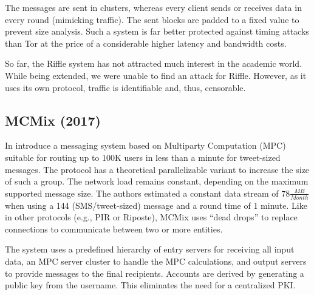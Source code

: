 The messages are sent in clusters, whereas every client sends or receives data in every round (mimicking traffic). The sent blocks are padded to a fixed value to prevent size analysis. Such a system is far better protected against timing attacks than Tor at the price of a considerable higher latency and bandwidth costs. 

So far, the Riffle system has not attracted much interest in the academic world. While being extended, we were unable to find an attack for Riffle. However, as it uses its own protocol, traffic is identifiable and, thus, censorable.

%

%

%

\subsection{MCMix (2017)}
In \cite{alexopoulos2017mcmix} \citeauthor{alexopoulos2017mcmix} introduce a messaging system based on Multiparty Computation (MPC) suitable for routing up to 100K users in less than a minute for tweet-sized messages. The protocol has a theoretical parallelizable variant to increase the size of such a group. The network load remains constant, depending on the maximum supported message size. The authors estimated a constant data stream of $78 \frac{MB}{Month}$ when using a 144 (SMS/tweet-sized) message and a round time of 1 minute. Like in other protocols (e.g., PIR or Riposte), MCMix uses ``dead drops'' to replace connections to communicate between two or more entities. 

The system uses a predefined hierarchy of entry servers for receiving all input data, an MPC server cluster to handle the MPC calculations, and output servers to provide messages to the final recipients. Accounts are derived by generating a public key from the username. This eliminates the need for a centralized PKI. 

